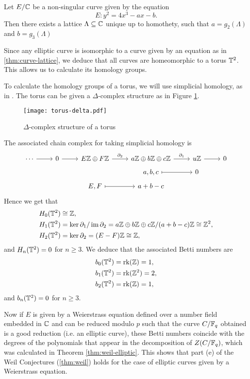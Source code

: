 \begin{theorem}
	\label{thm:curve-lattice}
	Let $E/\mathbb{C}$ be a non-singular curve given by the equation
	\begin{equation*}
		E: y^2 = 4x^3 - ax - b.
	\end{equation*} 
	Then there exists a lattice
	$\Lambda \subseteq \mathbb{C}$ unique up to homothety, such that
	$a = g_2(\Lambda)$ and $b = g_3(\Lambda)$
\end{theorem}

Since any elliptic curve is isomorphic to a curve given by an equation as in
\ref{thm:curve-lattice}, we deduce that all curves are homeomorphic
to a torus $\mathbb{T}^2$. This allows us to calculate its homology groups.

To calculate the homology groups of a torus, we will use simplicial homology,
as in \cite[\S2.1]{hatcher}. The torus can be given a $\Delta$-complex structure
as in Figure \ref{fig:torus-delta}.
\begin{figure}[h]
	\centering 
	\texttt{[image: torus-delta.pdf]}
	\caption[torus-delta]{$\Delta$-complex structure of a torus}
	\label{fig:torus-delta}
\end{figure}

The associated chain complex for taking simplicial homology is 
\begin{equation*}
	\begin{tikzcd}[row sep=tiny]
	\cdots & 0 & {E\Z \oplus F\Z} & {a\Z\oplus b\Z\oplus c\Z} & u\Z & 0 \\
	&&& {a,b,c} & 0 \\
	&& {E,F} & {a +b-c}
	\arrow["\partial_1", from=1-4, to=1-5]
	\arrow["\partial_2", from=1-3, to=1-4]
	\arrow[from=1-5, to=1-6]
	\arrow[from=1-2, to=1-3]
	\arrow[from=1-1, to=1-2]
	\arrow[maps to, from=3-3, to=3-4]
	\arrow[maps to, from=2-4, to=2-5]
\end{tikzcd}
\end{equation*}
Hence we get that
\begin{align*}
	H_0(\mathbb{T}^2) &\cong \mathbb{Z},\\
	H_1(\mathbb{T}^2) &= \ker \partial_1 / \operatorname{im} \partial_2
	= a\mathbb{Z} \oplus b\mathbb{Z} \oplus c\mathbb{Z} / (a + b - c)\mathbb{Z} \cong \mathbb{Z}^2,\\
	H_2(\mathbb{T}^2) &= \ker \partial_2 = (E-F)\mathbb{Z} \cong \mathbb{Z},
\end{align*}
and $H_n(\mathbb{T}^2) = 0$ for $n \geq 3$.
We deduce that the associated Betti numbers are
\begin{align*}
	b_0(\mathbb{T}^2) &= \operatorname{rk}(\mathbb{Z}) = 1,\\
	b_1(\mathbb{T}^2) &= \operatorname{rk}(\mathbb{Z}^2) = 2,\\
	b_2(\mathbb{T}^2) &= \operatorname{rk}(\mathbb{Z}) = 1,
\end{align*}
and $b_n(\mathbb{T}^2) = 0$ for $n \geq 3$.

Now if $E$ is given by a Weierstrass equation
defined over a number field embedded
in $\mathbb{C}$ and can be reduced modulo $p$ such that the curve
$C/\mathbb{F}_q$ obtained is a good reduction (i.e. an elliptic curve),
these Betti numbers coincide with
the degrees of the polynomials that appear in the decomposition of
$Z(C/\mathbb{F}_q)$, which was calculated in Theorem \ref{thm:weil-elliptic}.
This shows that part (e) of the Weil Conjectures
(\ref{thm:weil}) holds for the case of elliptic curves given by a Weierstrass
equation.
